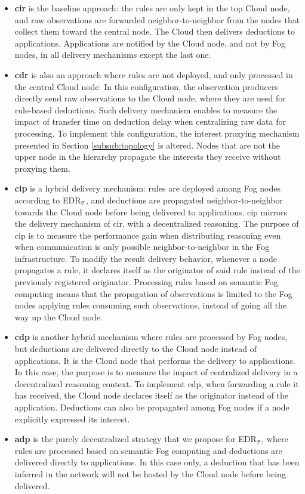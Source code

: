 \documentclass{iosart2c}
\newcommand{\edrt}{EDR$_{\mathcal{T}}$\xspace}
\begin{document}
\begin{itemize}
	\item \textbf{\gls{cir}} is the baseline approach: the rules are only kept in the top Cloud node, and raw observations are forwarded neighbor-to-neighbor from the nodes that collect them toward the central node. 
	The Cloud then delivers deductions to applications. 
	Applications are notified by the Cloud node, and not by Fog nodes, in all delivery mechanisms except the last one.
	
	\item \textbf{\gls{cdr}} is also an approach where rules are not deployed, and only processed in the central Cloud node. 
	In this configuration, the observation producers directly send raw observations to the Cloud node, where they are used for rule-based deductions.
	Such delivery mechanism enables to measure the impact of transfer time on deduction delay when centralizing raw data for processing.
	To implement this configuration, the interest proxying mechanism presented in Section \textsection \ref{subsub:topology} is altered. 
	Nodes that are not the upper node in the hierarchy propagate the interests they receive without proxying them.
	
	\item \textbf{\gls{cip}} is a hybrid delivery mechanism: rules are deployed among Fog nodes according to \edrt, and deductions are propagated neighbor-to-neighbor towards the Cloud node before being delivered to applications. 
	\gls{cip} mirrors the delivery mechanism of \gls{cir}, with a decentralized reasoning.
	The purpose of \gls{cip} is to measure the performance gain when distributing reasoning even when communication is only possible neighbor-to-neighbor in the Fog infrastructure.
	To modify the result delivery behavior, whenever a node propagates a rule, it declares itself as the originator of said rule instead of the previously registered originator.
	Processing rules based on semantic Fog computing means that the propagation of observations is limited to the Fog nodes applying rules consuming such observations, instead of going all the way up the Cloud node.
	
	\item \textbf{\gls{cdp}} is another hybrid mechanism where rules are processed by Fog nodes, but deductions are delivered directly to the Cloud node instead of applications.
	It is the Cloud node that performs the delivery to applications.
	In this case, the purpose is to measure the impact of centralized delivery in a decentralized reasoning context.
	To implement \gls{cdp}, when forwarding a rule it has received, the Cloud node declares itself as the originator instead of the application.
	Deductions can also be propagated among Fog nodes if a node explicitly expressed its interest.
	
	\item \textbf{\gls{adp}} is the purely decentralized strategy that we propose for \edrt, where rules are processed based on semantic Fog computing and deductions are delivered directly to applications. 
	In this case only, a deduction that has been inferred in the network will not be hosted by the Cloud node before being delivered.
\end{itemize}
\end{document}
